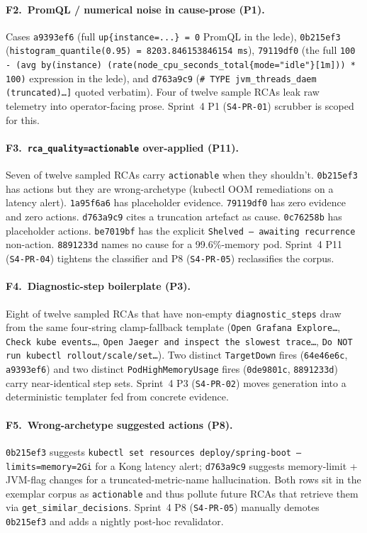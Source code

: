 \documentclass[11pt,a4paper,oneside]{report}
\begin{document}
\paragraph{F2.~PromQL / numerical noise in cause-prose (P1).}
Cases \texttt{a9393ef6} (full \texttt{up\{instance=...\} = 0}
PromQL in the lede), \texttt{0b215ef3} (\texttt{histogram\_quantile(0.95)
= 8203.846153846154 ms}), \texttt{79119df0} (the full
\texttt{100 - (avg by(instance) (rate(node\_cpu\_seconds\_total\{mode="idle"\}[1m])) * 100)}
expression in the lede), and \texttt{d763a9c9} (\texttt{\# TYPE
jvm\_threads\_daem (truncated)\ldots]} quoted verbatim).  Four of
twelve sample RCAs leak raw telemetry into operator-facing prose.
Sprint~4 P1 (\texttt{S4-PR-01}) scrubber is scoped for this.

\paragraph{F3.~\texttt{rca\_quality=actionable} over-applied (P11).}
Seven of twelve sampled RCAs carry \texttt{actionable} when they
shouldn't.  \texttt{0b215ef3} has actions but they are
wrong-archetype (kubectl OOM remediations on a latency alert).
\texttt{1a95f6a6} has placeholder evidence.  \texttt{79119df0} has
zero evidence and zero actions.  \texttt{d763a9c9} cites a
truncation artefact as cause.  \texttt{0c76258b} has placeholder
actions.  \texttt{be7019bf} has the explicit
\texttt{Shelved --- awaiting recurrence} non-action.
\texttt{8891233d} names no cause for a 99.6\%-memory pod.  Sprint~4
P11 (\texttt{S4-PR-04}) tightens the classifier and P8
(\texttt{S4-PR-05}) reclassifies the corpus.

\paragraph{F4.~Diagnostic-step boilerplate (P3).}
Eight of twelve sampled RCAs that have non-empty
\texttt{diagnostic\_steps} draw from the same four-string
clamp-fallback template (\texttt{Open Grafana Explore\ldots},
\texttt{Check kube events\ldots}, \texttt{Open Jaeger and inspect
the slowest trace\ldots}, \texttt{Do NOT run kubectl
rollout/scale/set\ldots}).  Two distinct \texttt{TargetDown} fires
(\texttt{64e46e6c}, \texttt{a9393ef6}) and two distinct
\texttt{PodHighMemoryUsage} fires (\texttt{0de9801c},
\texttt{8891233d}) carry near-identical step sets.  Sprint~4 P3
(\texttt{S4-PR-02}) moves generation into a deterministic
templater fed from concrete evidence.

\paragraph{F5.~Wrong-archetype suggested actions (P8).}
\texttt{0b215ef3} suggests \texttt{kubectl set resources
deploy/spring-boot --limits=memory=2Gi} for a Kong latency alert;
\texttt{d763a9c9} suggests memory-limit + JVM-flag changes for a
truncated-metric-name hallucination.  Both rows sit in the
exemplar corpus as \texttt{actionable} and thus pollute future
RCAs that retrieve them via \texttt{get\_similar\_decisions}.
Sprint~4 P8 (\texttt{S4-PR-05}) manually demotes
\texttt{0b215ef3} and adds a nightly post-hoc revalidator.
\end{document}
